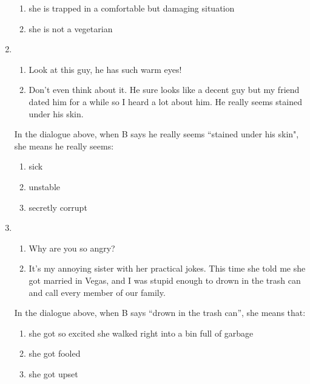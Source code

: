 \documentclass[output=paper]{langsci/langscibook}
\begin{document}
\begin{enumerate}
\begin{enumerate}[label=\arabic*.,noitemsep]
        \item she is trapped in a comfortable but damaging situation
        \item she is not a vegetarian
        \end{enumerate}
    \item\largerpage
       \begin{enumerate}[nosep,label=\Alph*:]
        \item Look at this guy, he has such warm eyes!
        \item Don't even think about it. He sure looks like a decent guy but my friend dated him for a while so I heard a lot about him. He really seems stained under his skin.
        \end{enumerate}
        In the dialogue above, when B says he really seems “stained under his skin", she means he really seems:
        \begin{enumerate}[label=\arabic*.,noitemsep]
        \item sick
        \item unstable
        \item secretly corrupt
        \end{enumerate}
    \item
       \begin{enumerate}[nosep,label=\Alph*:]
        \item Why are you so angry?
        \item It's my annoying sister with her practical jokes. This time she told me she got married in Vegas, and I was stupid enough to drown in the trash can and call every member of our family.
        \end{enumerate}
        In the dialogue above, when B says \enquote{drown in the trash can}, she means that:
        \begin{enumerate}[label=\arabic*.,noitemsep]
        \item she got so excited she walked right into a bin full of garbage
        \item she got  fooled
        \item she got upset
        \end{enumerate}
\end{enumerate}

\end{document}
